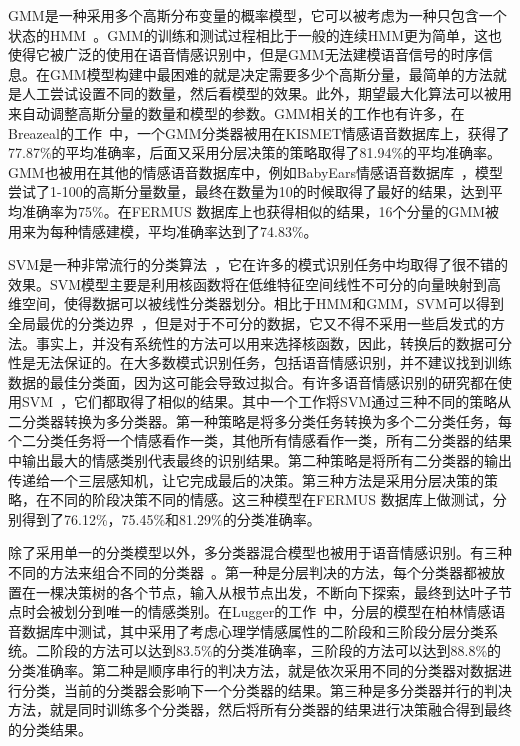 GMM是一种采用多个高斯分布变量的概率模型，它可以被考虑为一种只包含一个状态的HMM~\cite{Vlassis2002A, Reynolds1995Robust}。GMM的训练和测试过程相比于一般的连续HMM更为简单，这也使得它被广泛的使用在语音情感识别中，但是GMM无法建模语音信号的时序信息。在GMM模型构建中最困难的就是决定需要多少个高斯分量，最简单的方法就是人工尝试设置不同的数量，然后看模型的效果。此外，期望最大化算法可以被用来自动调整高斯分量的数量和模型的参数。GMM相关的工作也有许多，在Breazeal的工作~\cite{Breazeal2002Recognition}中，一个GMM分类器被用在KISMET情感语音数据库上，获得了77.87\%的平均准确率，后面又采用分层决策的策略取得了81.94\%的平均准确率。GMM也被用在其他的情感语音数据库中，例如BabyEars情感语音数据库~\cite{Slaney2003Baby}，模型尝试了1-100的高斯分量数量，最终在数量为10的时候取得了最好的结果，达到平均准确率为75\%。在FERMUS \uppercase\expandafter{}数据库上也获得相似的结果，16个分量的GMM被用来为每种情感建模，平均准确率达到了74.83\%。

SVM是一种非常流行的分类算法~\cite{Burges2008A}，它在许多的模式识别任务中均取得了很不错的效果。SVM模型主要是利用核函数将在低维特征空间线性不可分的向量映射到高维空间，使得数据可以被线性分类器划分。相比于HMM和GMM，SVM可以得到全局最优的分类边界~\cite{Burges1998A}，但是对于不可分的数据，它又不得不采用一些启发式的方法。事实上，并没有系统性的方法可以用来选择核函数，因此，转换后的数据可分性是无法保证的。在大多数模式识别任务，包括语音情感识别，并不建议找到训练数据的最佳分类面，因为这可能会导致过拟合。有许多语音情感识别的研究都在使用SVM~\cite{Lee2004Emotion, Schuller2004Speech, Kwon2003Emotion, Pierre2003The}，它们都取得了相似的结果。其中一个工作将SVM通过三种不同的策略从二分类器转换为多分类器。第一种策略是将多分类任务转换为多个二分类任务，每个二分类任务将一个情感看作一类，其他所有情感看作一类，所有二分类器的结果中输出最大的情感类别代表最终的识别结果。第二种策略是将所有二分类器的输出传递给一个三层感知机，让它完成最后的决策。第三种方法是采用分层决策的策略，在不同的阶段决策不同的情感。这三种模型在FERMUS \uppercase\expandafter{}数据库上做测试，分别得到了76.12\%，75.45\%和81.29\%的分类准确率。

除了采用单一的分类模型以外，多分类器混合模型也被用于语音情感识别。有三种不同的方法来组合不同的分类器~\cite{Kuncheva2004Combining, Lugger2015Combining}。第一种是分层判决的方法，每个分类器都被放置在一棵决策树的各个节点，输入从根节点出发，不断向下探索，最终到达叶子节点时会被划分到唯一的情感类别。在Lugger的工作~\cite{Lugger2008Psychological}中，分层的模型在柏林情感语音数据库中测试，其中采用了考虑心理学情感属性的二阶段和三阶段分层分类系统。二阶段的方法可以达到83.5\%的分类准确率，三阶段的方法可以达到88.8\%的分类准确率。第二种是顺序串行的判决方法，就是依次采用不同的分类器对数据进行分类，当前的分类器会影响下一个分类器的结果。第三种是多分类器并行的判决方法，就是同时训练多个分类器，然后将所有分类器的结果进行决策融合得到最终的分类结果。

